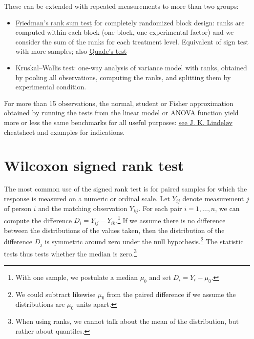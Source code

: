 \documentclass[
  11pt,
  letterpaper,
]{scrbook}
\providecommand{\tightlist}{%
  \setlength{\itemsep}{0pt}\setlength{\parskip}{0pt}}\usepackage{longtable,booktabs,array}
\theoremstyle{definition}
\theoremstyle{remark}
\begin{document}
These can be extended with repeated measurements to more than two
groups:

\begin{itemize}
\tightlist
\item
  \href{https://www.itl.nist.gov/div898/software/dataplot/refman1/auxillar/friedman.htm}{Friedman's
  rank sum test} for completely randomized block design: ranks are
  computed within each block (one block, one experimental factor) and we
  consider the sum of the ranks for each treatment level. Equivalent of
  sign test with more samples; also
  \href{https://www.itl.nist.gov/div898/software/dataplot/refman1/auxillar/quade.htm}{Quade's
  test}
\item
  Kruskal--Wallis test: one-way analysis of variance model with ranks,
  obtained by pooling all observations, computing the ranks, and
  splitting them by experimental condition.
\end{itemize}

For more than 15 observations, the normal, student or Fisher
approximation obtained by running the tests from the linear model or
ANOVA function yield more or less the same benchmarks for all useful
purposes: \href{https://lindeloev.github.io/tests-as-linear/}{see J. K.
Lindeløv} cheatsheet and examples for indications.

\hypertarget{wilcoxon-signed-rank-test}{%
\section{Wilcoxon signed rank test}\label{wilcoxon-signed-rank-test}}

The most common use of the signed rank test is for paired samples for
which the response is measured on a numeric or ordinal scale. Let
\(Y_{ij}\) denote measurement \(j\) of person \(i\) and the matching
observation \(Y_{kj}\). For each pair \(i=1, \ldots, n\), we can compute
the difference \(D_i = Y_{ij}-Y_{ik}\).\footnote{With one sample, we
  postulate a median \(\mu_0\) and set \(D_i = Y_{i} - \mu_0\).} If we
assume there is no difference between the distributions of the values
taken, then the distribution of the difference \(D_j\) is symmetric
around zero under the null hypothesis.\footnote{We could subtract
  likewise \(\mu_0\) from the paired difference if we assume the
  distributions are \(\mu_0\) units apart.} The statistic tests thus
tests whether the median is zero.\footnote{When using ranks, we cannot
  talk about the mean of the distribution, but rather about quantiles.}
\end{document}
